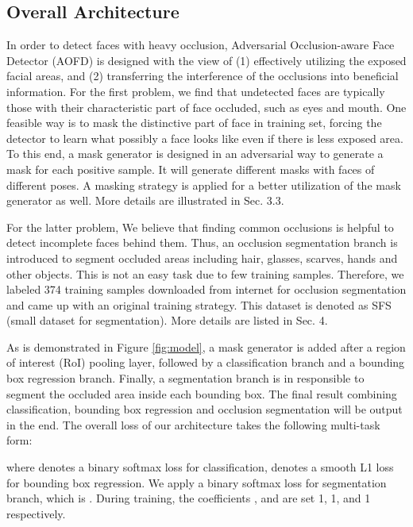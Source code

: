 \documentclass[10pt,twocolumn,letterpaper]{article}
\begin{document}
\subsection{Overall Architecture}
In order to detect faces with heavy occlusion, Adversarial Occlusion-aware Face Detector (AOFD) is designed with the view of (1) effectively utilizing the exposed facial areas, and (2) transferring the interference of the occlusions into beneficial information. For the first problem, we find that undetected faces are typically those with their characteristic part of face occluded, such as eyes and mouth. 
One feasible way is to mask the distinctive part of face in training set, forcing the detector to learn what possibly a face looks like even if there is less exposed area. To this end, a mask generator is designed in an adversarial way to generate a mask for each positive sample. It will generate different masks with faces of different poses. A masking strategy is applied for a better utilization of the mask generator as well. More details are illustrated in Sec. 3.3.

For the latter problem, We believe that finding common occlusions is helpful to detect incomplete faces behind them. Thus, an occlusion segmentation branch is introduced to segment occluded areas including hair, glasses, scarves, hands and other objects. This is not an easy task due to few training samples. Therefore, we labeled 374 training samples downloaded from internet for occlusion segmentation and came up with an original training strategy. This dataset is denoted as SFS (small dataset for segmentation). More details are listed in Sec. 4. 


As is demonstrated in Figure \ref{fig:model}, a mask generator is added after a region of interest (RoI) pooling layer, followed by a classification branch and a bounding box regression branch. Finally, a segmentation branch is in responsible to segment the occluded area inside each bounding box. The final result combining classification, bounding box regression and occlusion segmentation will be output in the end. The overall loss of our architecture takes the following multi-task form:




where  denotes a binary softmax loss for classification,  denotes a smooth L1 loss for bounding box regression. We apply a binary softmax loss for segmentation branch, which is . During training, the coefficients ,  and  are set 1, 1, and 1 respectively. 
\end{document}
